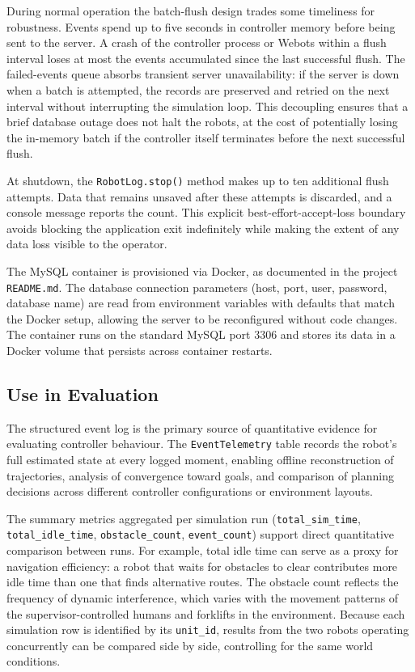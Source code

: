 During normal operation the batch-flush design trades some timeliness for robustness. Events spend up to five seconds in controller memory before being sent to the server. A crash of the controller process or Webots within a flush interval loses at most the events accumulated since the last successful flush. The failed-events queue absorbs transient server unavailability: if the server is down when a batch is attempted, the records are preserved and retried on the next interval without interrupting the simulation loop. This decoupling ensures that a brief database outage does not halt the robots, at the cost of potentially losing the in-memory batch if the controller itself terminates before the next successful flush.

At shutdown, the \texttt{RobotLog.stop()} method makes up to ten additional flush attempts. Data that remains unsaved after these attempts is discarded, and a console message reports the count. This explicit best-effort-accept-loss boundary avoids blocking the application exit indefinitely while making the extent of any data loss visible to the operator.

The MySQL container is provisioned via Docker, as documented in the project \texttt{README.md}. The database connection parameters (host, port, user, password, database name) are read from environment variables with defaults that match the Docker setup, allowing the server to be reconfigured without code changes. The container runs on the standard MySQL port 3306 and stores its data in a Docker volume that persists across container restarts.

\subsection{Use in Evaluation}
\label{sec:logger-evaluation}

The structured event log is the primary source of quantitative evidence for evaluating controller behaviour. The \texttt{EventTelemetry} table records the robot's full estimated state at every logged moment, enabling offline reconstruction of trajectories, analysis of convergence toward goals, and comparison of planning decisions across different controller configurations or environment layouts.

The summary metrics aggregated per simulation run (\texttt{total\_sim\_time}, \texttt{total\_idle\_time}, \texttt{obstacle\_count}, \texttt{event\_count}) support direct quantitative comparison between runs. For example, total idle time can serve as a proxy for navigation efficiency: a robot that waits for obstacles to clear contributes more idle time than one that finds alternative routes. The obstacle count reflects the frequency of dynamic interference, which varies with the movement patterns of the supervisor-controlled humans and forklifts in the environment. Because each simulation row is identified by its \texttt{unit\_id}, results from the two robots operating concurrently can be compared side by side, controlling for the same world conditions.

